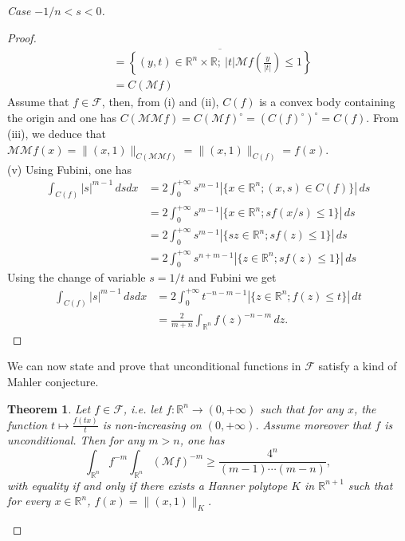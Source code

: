 \documentclass[10pt]{amsart}
\newtheorem{thm}{Theorem}[section]
\theoremstyle{definition}
\theoremstyle{remark}
\newcommand{\R}{\mathbb{R}}
\newcommand{\M}{\mathcal{M}}
\newcommand{\F}{\mathcal{F}}
\begin{document}
\begin{proof}[Case $-1/n<s< 0$]
\begin{proof}
\begin{align*}
&= \overline{\left\{(y,t)\in\R^n\times\R;\ |t|\M f\left(\frac{y}{|t|}\right)\le1\right\}}\\
&=C(\M f)
\end{align*}
Assume that  $f\in\F$, then, from (i) and (ii), $C(f)$ is a convex body containing the origin and one has $C(\M \M f)=C(\M f)^\circ=(C(f)^\circ)^\circ=C(f)$. From (iii), we deduce that $\M\M f(x)=\|(x,1)\|_{C(\M \M f)}=\|(x,1)\|_{C(f)}=f(x)$.\\
(v)
Using Fubini, one has 
\begin{align*}
\int_{C(f)}|s|^{m-1}\,dsdx &=2\int_0^{+\infty}s^{m-1}|\{x\in\R^n; (x,s)\in C(f)\}|\,ds\\
&=2\int_0^{+\infty}s^{m-1}|\{x\in\R^n; sf(x/s)\le1\}|\,ds\\
&=2\int_0^{+\infty}s^{m-1}|\{sz\in\R^n; sf(z)\le1\}|\,ds\\
&=2\int_0^{+\infty}s^{n+m-1}|\{z\in\R^n; sf(z)\le1\}|\,ds
\end{align*}
Using the change of variable $s=1/t$ and Fubini we get
\begin{align*}
\int_{C(f)}|s|^{m-1}\,dsdx &=2\int_0^{+\infty}t^{-n-m-1}|\{z\in\R^n; f(z)\le t\}|\,dt\\
&=\frac{2}{m+n}\int_{\R^n}f(z)^{-n-m}\,dz.
\end{align*}
\end{proof}

We can now state and prove that unconditional functions in $\F$ satisfy a kind of Mahler conjecture.

\begin{thm}\label{mahler-for-F}
Let $f\in\F$, \em{i.e.} let $f:\R^n\to(0,+\infty)$ such that for any $x$, the function $t\mapsto\frac{f(tx)}{t}$ is non-increasing on $(0,+\infty)$. Assume moreover that $f$ is unconditional. Then for any $m>n$, one has 
\[
\int_{\R^n} f^{-m} \int_{\R^n} (\M f)^{-m}\ge \frac{4^n}{(m-1)\cdots(m-n)},
\]
with equality if and only if there exists a Hanner polytope $K$ in $\R^{n+1}$ such that for every $x\in\R^n$, $f(x)=\|(x,1)\|_K$.
\end{thm}



\end{proof}
\end{document}
